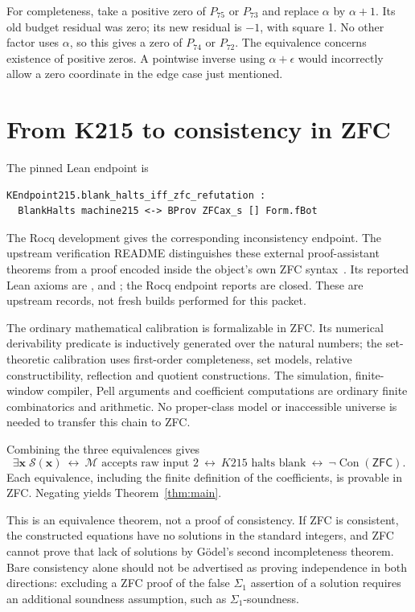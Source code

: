 \documentclass[11pt,a4paper]{article}
\theoremstyle{definition}\newtheorem{definition}[theorem]{Definition}
\newcommand{\ZFC}{\mathsf{ZFC}}
\newcommand{\Con}{\operatorname{Con}}
\newcommand{\file}[1]{\texttt{\detokenize{#1}}}
\begin{document}
For completeness, take a positive zero of $P_{75}$ or $P_{73}$
and replace $\alpha$ by $\alpha+1$. Its old budget residual was zero;
its new residual is $-1$, with square 1. No other factor uses
$\alpha$, so this gives a zero of $P_{74}$ or $P_{72}$.
The equivalence concerns existence of positive zeros. A pointwise
inverse using $\alpha+\epsilon$ would incorrectly allow a zero
coordinate in the edge case just mentioned.

\section{From K215 to consistency in ZFC}\label{sec:logic}
The pinned Lean endpoint is
\begin{lstlisting}
KEndpoint215.blank_halts_iff_zfc_refutation :
  BlankHalts machine215 <-> BProv ZFCax_s [] Form.fBot
\end{lstlisting}
The Rocq development gives the corresponding inconsistency endpoint.
The upstream verification README distinguishes these external
proof-assistant theorems from a proof encoded inside the object's own
ZFC syntax~\cite{k215,endpoint}. Its reported Lean axioms are
\file{propext}, \file{Classical.choice} and \file{Quot.sound}; the
Rocq endpoint reports are closed. These are upstream records, not
fresh builds performed for this packet.

The ordinary mathematical calibration is formalizable in ZFC. Its
numerical derivability predicate is inductively generated over the
natural numbers; the set-theoretic calibration uses first-order
completeness, set models, relative constructibility, reflection and
quotient constructions. The simulation, finite-window compiler,
Pell arguments and coefficient computations are ordinary finite
combinatorics and arithmetic. No proper-class model or inaccessible
universe is needed to transfer this chain to ZFC.

Combining the three equivalences gives
\[
 \exists\boldsymbol{x}\;\mathcal S(\boldsymbol{x})
 \ \longleftrightarrow\
 \mathcal M\text{ accepts raw input }2
 \ \longleftrightarrow\
 K215\text{ halts blank}
 \ \longleftrightarrow\
 \neg\Con(\ZFC).
\]
Each equivalence, including the finite definition of the coefficients,
is provable in ZFC. Negating yields Theorem~\ref{thm:main}.

This is an equivalence theorem, not a proof of consistency.
If ZFC is consistent, the constructed equations have no solutions in
the standard integers, and ZFC cannot prove that lack of solutions by
G\"odel's second incompleteness theorem. Bare consistency alone should
not be advertised as proving independence in both directions:
excluding a ZFC proof of the false $\Sigma_1$ assertion of a solution
requires an additional soundness assumption, such as $\Sigma_1$-soundness.
\end{document}
